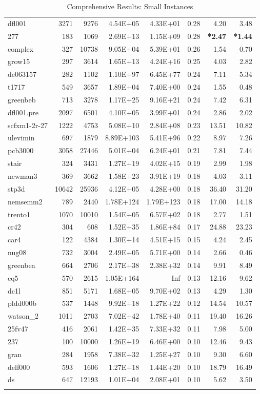 \documentclass[10pt]{article}
\newcommand{\red}{
	\color{red}	
	}
\begin{document}
\begin{longtable}{|l|r|r|r|r|r|r|r|}
dfl001	&	3271	&	9276	&	4.54E+05	&	4.33E+01	&	0.28	&	4.20	&	3.48	\\
277	&	183	&	1069	&	2.69E+13	&	1.15E+09	&	0.28	&	{\bf \red *2.47}	&	{\bf \red *1.44} 	\\
complex	&	327	&	10738	&	9.05E+04	&	5.39E+01	&	0.26	&	1.54	&	0.70	\\
grow15	&	297	&	3614	&	1.65E+13	&	4.24E+16	&	0.25	&	4.03	&	2.82	\\
de063157	&	282	&	1102	&	1.10E+97	&	6.45E+77	&	0.24	&	7.11	&	5.34	\\
t1717	&	549	&	3657	&	1.89E+04	&	7.40E+00	&	0.24	&	1.55	&	0.48	\\
greenbeb	&	713	&	3278	&	1.17E+25	&	9.16E+21	&	0.24	&	7.42	&	6.31	\\
dfl001.pre	&	2097	&	6501	&	4.10E+05	&	3.99E+01	&	0.24	&	2.86	&	2.02	\\
scfxm1-2r-27	&	1222	&	4753	&	5.08E+10	&	2.84E+08	&	0.23	&	13.51	&	10.82	\\
ulevimin	&	697	&	1879	&	8.89E+103	&	5.41E+96	&	0.22	&	8.97	&	7.26	\\
pcb3000	&	3058	&	27446	&	5.01E+04	&	6.24E+01	&	0.21	&	7.81	&	7.44	\\
stair	&	324	&	3431	&	1.27E+19	&	4.02E+15	&	0.19	&	2.99	&	1.98	\\
newman3	&	369	&	3662	&	1.58E+23	&	3.91E+19	&	0.18	&	4.03	&	3.11	\\
stp3d	&	10642	&	25936	&	4.12E+05	&	4.28E+00	&	0.18	&	36.40	&	31.20	\\
nemsemm2	&	789	&	2440	&	1.78E+124	&	1.79E+123	&	0.18	&	17.00	&	14.18	\\
trento1	&	1070	&	10010	&	1.54E+05	&	6.57E+02	&	0.18	&	2.77	&	1.51	\\
cr42	&	304	&	608	&	1.52E+35	&	1.86E+84	&	0.17	&	24.88	&	23.23	\\
car4	&	122	&	4384	&	1.30E+14	&	4.51E+15	&	0.15	&	4.24	&	2.45	\\
nug08	&	732	&	3004	&	2.49E+05	&	5.71E+00	&	0.14	&	2.66	&	0.46	\\
greenbea	&	664	&	2706	&	2.17E+38	&	2.38E+32	&	0.14	&	9.91	&	8.49	\\
cq5	&	570	&	2615	&	1.05E+164	&	Inf	&	0.13	&	12.16	&	9.62	\\
dc1l	&	851	&	5171	&	1.68E+05	&	9.70E+02	&	0.13	&	4.29	&	1.30	\\
pldd000b	&	537	&	1448	&	9.92E+18	&	1.27E+22	&	0.12	&	14.54	&	10.57	\\
watson\_2	&	1011	&	2703	&	7.02E+42	&	1.78E+40	&	0.11	&	19.40	&	16.26	\\
25fv47	&	416	&	2061	&	1.42E+35	&	7.33E+32	&	0.11	&	7.98	&	5.00	\\
237	&	100	&	10000	&	1.26E+19	&	6.46E+00	&	0.10	&	12.46	&	9.43	\\
gran	&	284	&	1958	&	7.38E+32	&	1.25E+27	&	0.10	&	9.30	&	6.60	\\
delf000	&	593	&	1606	&	1.27E+18	&	1.44E+20	&	0.10	&	18.79	&	16.49	\\
ds	&	647	&	12193	&	1.01E+04	&	2.08E+01	&	0.10	&	5.62	&	3.50	\\
\hline
\caption{Comprehensive Results: Small Instances}
\small
\centering
\label{supptab:all_small}
\end{longtable}
\end{document}

